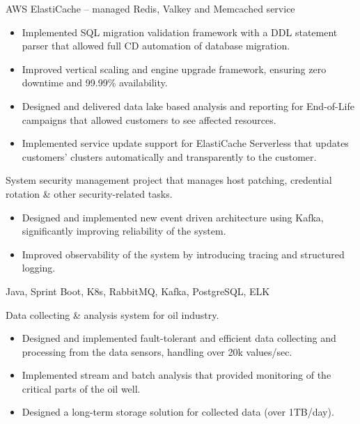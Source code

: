 \documentclass[10pt,a4paper,ragged2e,withhyper]{altacv}
\begin{document}
\begin{paracol}{2}


AWS ElastiCache – managed Redis, Valkey and Memcached service

\begin{itemize}
  \item Implemented SQL migration validation framework with a DDL statement parser that allowed full CD automation of database migration.
  \item Improved vertical scaling and engine upgrade framework, ensuring zero downtime and 99.99\% availability.
  \item Designed and delivered data lake based analysis and reporting for End-of-Life campaigns that allowed customers to see affected resources.
  \item Implemented service update support for ElastiCache Serverless that updates customers' clusters automatically and transparently to the customer. 
\end{itemize}

\divider


System security management project that manages host patching, credential rotation \& other security-related tasks.
\begin{itemize}
  \item Designed and implemented new event driven architecture using Kafka, significantly improving reliability of the system.
  \item Improved observability of the system by introducing tracing and structured logging.
\end{itemize}

Java, Sprint Boot, K8s, RabbitMQ, Kafka, PostgreSQL, ELK

\divider


Data collecting \& analysis system for oil industry.
\begin{itemize}
  \item Designed and implemented fault-tolerant and efficient data collecting and processing from the data sensors, handling over 20k values/sec.
  \item Implemented stream and batch analysis that provided monitoring of the critical parts of the oil well.
  \item Designed a long-term storage solution for collected data (over 1TB/day).
\end{itemize}


\end{paracol}
\end{document}
